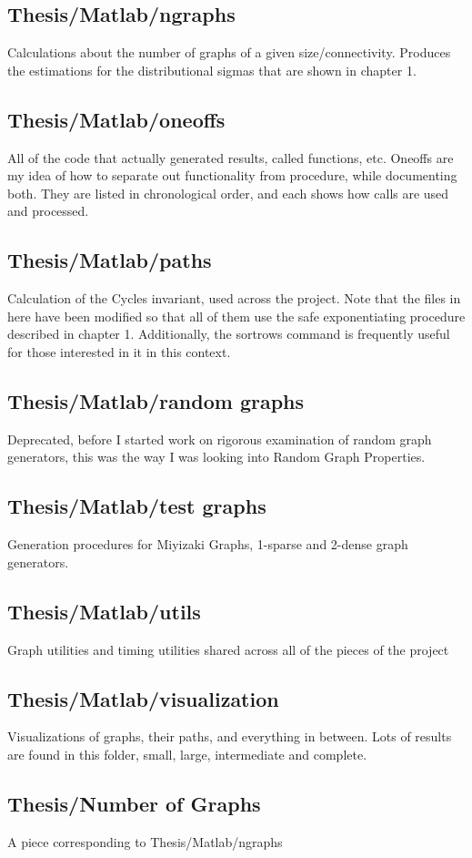 \subsection*{Thesis/Matlab/ngraphs}

Calculations about the number of graphs of a given size/connectivity.
Produces the estimations for the distributional sigmas that are shown in chapter 1.

\subsection*{Thesis/Matlab/oneoffs}

All of the code that actually generated results, called functions, etc.
Oneoffs are my idea of how to separate out functionality from procedure, while documenting both.
They are listed in chronological order, and each shows how calls are used and processed.

\subsection*{Thesis/Matlab/paths}

Calculation of the Cycles invariant, used across the project.
Note that the files in here have been modified so that all of them use the safe exponentiating procedure described in chapter 1.
Additionally, the sortrows command is frequently useful for those interested in it in this context.

\subsection*{Thesis/Matlab/random graphs}
Deprecated, before I started work on rigorous examination of random graph generators, this was the way I was looking into Random Graph Properties.

\subsection*{Thesis/Matlab/test graphs}

Generation procedures for Miyizaki Graphs, 1-sparse and 2-dense graph generators.

\subsection*{Thesis/Matlab/utils}

Graph utilities and timing utilities shared across all of the pieces of the project

\subsection*{Thesis/Matlab/visualization}

Visualizations of graphs, their paths, and everything in between. 
Lots of results are found in this folder, small, large, intermediate and complete.

\subsection*{Thesis/Number of Graphs}

A piece corresponding to Thesis/Matlab/ngraphs
